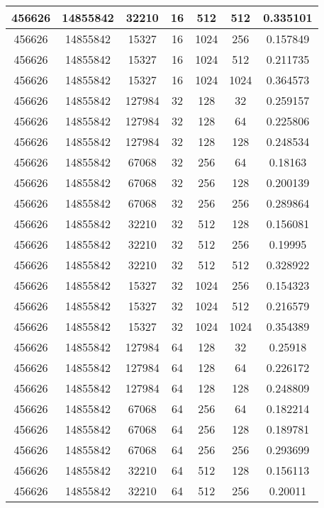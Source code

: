 \documentclass[9pt]{article}
\begin{document}
\begin{tabular}{|c|c|c|c|c|c|c| }
\hline
456626  & 14855842  & 32210  & 16  & 512  & 512  & 0.335101 \\
\hline
456626  & 14855842  & 15327  & 16  & 1024  & 256  & 0.157849 \\
\hline
456626  & 14855842  & 15327  & 16  & 1024  & 512  & 0.211735 \\
\hline
456626  & 14855842  & 15327  & 16  & 1024  & 1024  & 0.364573 \\
\hline
456626  & 14855842  & 127984  & 32  & 128  & 32  & 0.259157 \\
\hline
456626  & 14855842  & 127984  & 32  & 128  & 64  & 0.225806 \\
\hline
456626  & 14855842  & 127984  & 32  & 128  & 128  & 0.248534 \\
\hline
456626  & 14855842  & 67068  & 32  & 256  & 64  & 0.18163 \\
\hline
456626  & 14855842  & 67068  & 32  & 256  & 128  & 0.200139 \\
\hline
456626  & 14855842  & 67068  & 32  & 256  & 256  & 0.289864 \\
\hline
456626  & 14855842  & 32210  & 32  & 512  & 128  & 0.156081 \\
\hline
456626  & 14855842  & 32210  & 32  & 512  & 256  & 0.19995 \\
\hline
456626  & 14855842  & 32210  & 32  & 512  & 512  & 0.328922 \\
\hline
456626  & 14855842  & 15327  & 32  & 1024  & 256  & 0.154323 \\
\hline
456626  & 14855842  & 15327  & 32  & 1024  & 512  & 0.216579 \\
\hline
456626  & 14855842  & 15327  & 32  & 1024  & 1024  & 0.354389 \\
\hline
456626  & 14855842  & 127984  & 64  & 128  & 32  & 0.25918 \\
\hline
456626  & 14855842  & 127984  & 64  & 128  & 64  & 0.226172 \\
\hline
456626  & 14855842  & 127984  & 64  & 128  & 128  & 0.248809 \\
\hline
456626  & 14855842  & 67068  & 64  & 256  & 64  & 0.182214 \\
\hline
456626  & 14855842  & 67068  & 64  & 256  & 128  & 0.189781 \\
\hline
456626  & 14855842  & 67068  & 64  & 256  & 256  & 0.293699 \\
\hline
456626  & 14855842  & 32210  & 64  & 512  & 128  & 0.156113 \\
\hline
456626  & 14855842  & 32210  & 64  & 512  & 256  & 0.20011 \\

\end{tabular}
\end{document}
